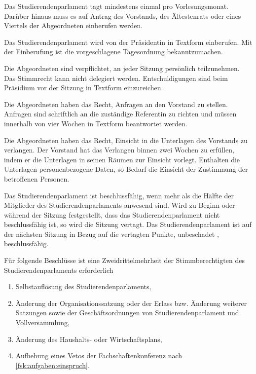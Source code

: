 \begin{contract}
Das Studierendenparlament tagt mindestens einmal pro Vorlesungsmonat. Darüber hinaus muss es auf Antrag des Vorstands, des Ältestenrats oder eines Viertels der Abgeordneten einberufen werden.

Das Studierendenparlament wird von der Präsidentin in Textform einberufen. Mit der Einberufung ist die vorgeschlagene Tagesordnung bekanntzumachen.

Die Abgeordneten sind verpflichtet, an jeder Sitzung persönlich teilzunehmen. Das Stimmrecht kann nicht delegiert werden. Entschuldigungen sind beim Präsidium vor der Sitzung in Textform einzureichen.

Die Abgeordneten haben das Recht, Anfragen an den Vorstand zu stellen. Anfragen sind schriftlich an die zuständige Referentin zu richten und müssen innerhalb von vier Wochen in Textform beantwortet werden.

Die Abgeordneten haben das Recht, Einsicht in die Unterlagen des Vorstands zu verlangen. Der Vorstand hat das Verlangen binnen zwei Wochen zu erfüllen, indem er die Unterlagen in seinen Räumen zur Einsicht vorlegt. Enthalten die Unterlagen personenbezogene Daten, so Bedarf die Einsicht der Zustimmung der betroffenen Personen.


\label{stupa:beschluesse}

Das Studierendenparlament ist beschlussfähig, wenn mehr als die Hälfte der Mitglieder des Studierendenparlaments anwesend sind. Wird zu Beginn oder während der Sitzung festgestellt, dass das Studierendenparlament nicht beschlussfähig ist, so wird die Sitzung vertagt. Das Studierendenparlament ist auf der nächsten Sitzung in Bezug auf die vertagten Punkte, unbeschadet , beschlussfähig.

  Für folgende Beschlüsse ist eine Zweidrittelmehrheit der Stimmberechtigten des Studierendenparlaments erforderlich \label{stupa:beschluesse:zweidrittel} 
  \begin{enumerate}
  \item Selbstauflösung des Studierendenparlaments,
  \item Änderung der Organisationssatzung oder der Erlass bzw. Änderung weiterer Satzungen sowie der Ge\-schäfts\-ord\-nungen von Studierendenparlament und Vollversammlung,
  \item Änderung des Haushalts- oder Wirtschaftsplans,
  \item Aufhebung eines Vetos der Fachschaftenkonferenz nach \ref{fsk:aufgaben:einspruch}.
  \end{enumerate}



\end{contract}
